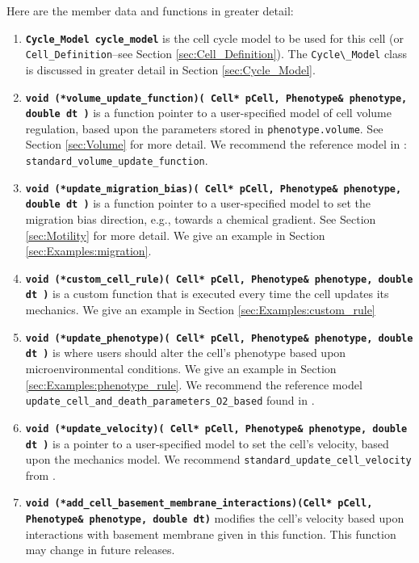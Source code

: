 \documentclass[12pt]{article}
\renewcommand{\v}{\verb}
\newcommand{\smallcode}[1]{\textbf{\texttt{#1}}}
\begin{document}
Here are the member data and functions in greater detail: 
\begin{enumerate}
\item
\smallcode{Cycle\_Model cycle\_model} is the cell cycle model 
to be used for this cell (or \v|Cell_Definition|--see Section \ref{sec:Cell_Definition}). 
The \v|Cycle\_Model| class is discussed in greater detail in 
Section \ref{sec:Cycle_Model}.  

\item
\smallcode{void (*volume\_update\_function)( Cell* pCell, Phenotype\& phenotype, double dt )} is 
a function pointer to a user-specified model of cell volume regulation, based upon the 
parameters stored in \v|phenotype.volume|. See Section \ref{sec:Volume} for more detail. 
We recommend the reference model in 
\cite{ref:PhysiCell}: \v|standard_volume_update_function|.

\item
\smallcode{void (*update\_migration\_bias)( Cell* pCell, Phenotype\& phenotype, \\
\phantom{void }double dt )} 
is a function pointer to a user-specified model to set the migration bias direction, 
e.g., towards a chemical gradient. See Section \ref{sec:Motility} for more detail. We 
give an example in Section \ref{sec:Examples:migration}.

\item
\smallcode{void (*custom\_cell\_rule)( Cell* pCell, Phenotype\& phenotype, double dt )} is a custom 
function that is executed every time the cell updates its mechanics. We 
give an example in Section \ref{sec:Examples:custom_rule}

\item
\smallcode{void (*update\_phenotype)( Cell* pCell, Phenotype\& phenotype, double dt )} is where 
users should alter the cell's phenotype based upon microenvironmental conditions. We 
give an example in Section \ref{sec:Examples:phenotype_rule}. 
We recommend the reference model \\ 
\v|update_cell_and_death_parameters_O2_based| found in \cite{ref:PhysiCell}.

\item
\smallcode{void (*update\_velocity)( Cell* pCell, Phenotype\& phenotype, double dt )} is a pointer 
to a user-specified model to set the cell's velocity, based upon the mechanics model. 
We recommend \v|standard_update_cell_velocity| from \cite{ref:PhysiCell}. 

\item
\smallcode{void (*add\_cell\_basement\_membrane\_interactions)(Cell* pCell, \\
\phantom{void }Phenotype\& phenotype, double dt)} 
modifies the cell's velocity based upon interactions with basement membrane given in this function. 
This function may change in future releases. 


\end{enumerate}
\end{document}
